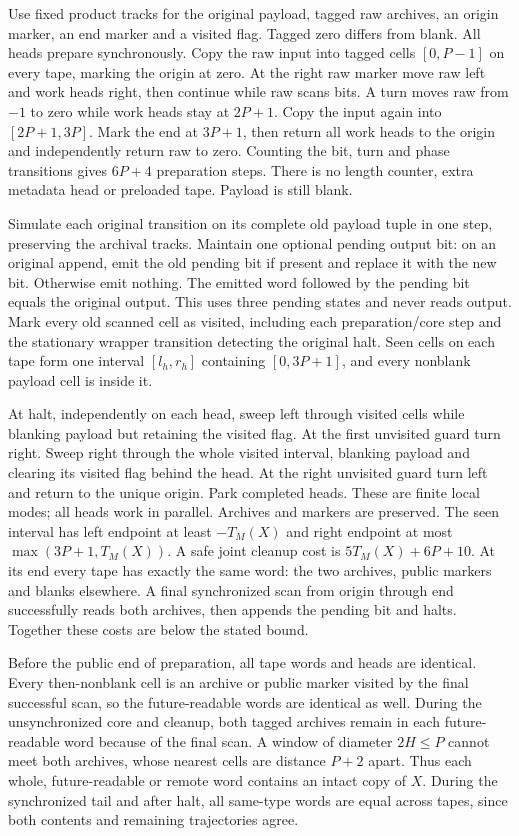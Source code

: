 \begin{informalproof}
Use fixed product tracks for the original payload, tagged raw archives,
an origin marker, an end marker and a visited flag. Tagged zero differs from
blank. All heads prepare synchronously. Copy the raw input into tagged cells
$[0,P-1]$ on every tape, marking the origin at zero. At the right raw marker
move raw left and work heads right, then continue while raw scans bits. A
turn moves raw from $-1$ to zero while work heads stay at $2P+1$. Copy the
input again into $[2P+1,3P]$. Mark the end at $3P+1$, then return all work
heads to the origin and independently return raw to zero. Counting the bit,
turn and phase transitions gives $6P+4$ preparation steps. There is no length
counter, extra metadata head or preloaded tape. Payload is still blank.

Simulate each original transition on its complete old payload tuple in one
step, preserving the archival tracks. Maintain one optional pending output
bit: on an original append, emit the old pending bit if present and replace
it with the new bit. Otherwise emit nothing. The emitted word followed by
the pending bit equals the original output. This uses three pending states
and never reads output. Mark every old scanned cell as visited, including
each preparation/core step and the stationary wrapper transition detecting
the original halt. Seen cells on each tape form one interval $[l_h,r_h]$
containing $[0,3P+1]$, and every nonblank payload cell is inside it.

At halt, independently on each head, sweep left through visited cells while
blanking payload but retaining the visited flag. At the first unvisited
guard turn right. Sweep right through the whole visited interval, blanking
payload and clearing its visited flag behind the head. At the right unvisited
guard turn left and return to the unique origin. Park completed heads. These
are finite local modes; all heads work in parallel. Archives and markers are
preserved. The seen interval has left endpoint at least $-T_M(X)$ and right
endpoint at most $\max(3P+1,T_M(X))$. A safe joint cleanup cost is
$5T_M(X)+6P+10$. At its end every tape has exactly the same word: the two
archives, public markers and blanks elsewhere. A final synchronized scan
from origin through end successfully reads both archives, then appends the
pending bit and halts. Together these costs are below the stated bound.

Before the public end of preparation, all tape words and heads are identical.
Every then-nonblank cell is an archive or public marker visited by the final
successful scan, so the future-readable words are identical as well.
During the unsynchronized core and cleanup, both tagged archives remain in
each future-readable word because of the final scan. A window of diameter
$2H\le P$ cannot meet both archives, whose nearest cells are distance $P+2$
apart. Thus each whole, future-readable or remote word contains an intact
copy of $X$. During the synchronized tail and after halt, all same-type words
are equal across tapes, since both contents and remaining trajectories agree.


\end{informalproof}

